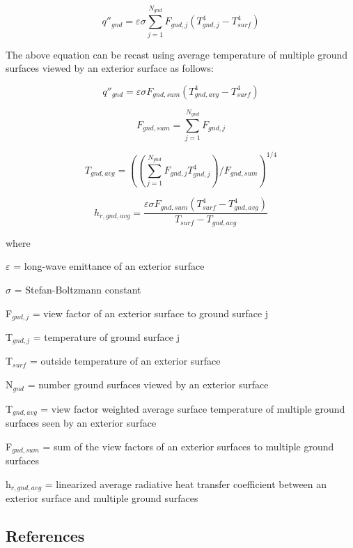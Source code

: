 \begin{equation}
{q''_{gnd}} = \varepsilon \sigma \sum\limits_{j = 1}^{{N_{gnd}}} {F_{gnd,j}} \left(T_{gnd,j}^4 - T_{surf}^4 \right)
\end{equation}

The above equation can be recast using average temperature of multiple ground surfaces viewed by an exterior surface as follows:

\begin{equation}
{q''_{gnd}} = \varepsilon \sigma {F_{gnd,sum}} (T_{gnd,avg}^4 - T_{surf}^4)
\end{equation}

\begin{equation}
{F_{gnd,sum}} = \sum\limits_{j = 1}^{{N_{gnd}}} {F_{gnd,j}}
\end{equation}

\begin{equation}
{T_{gnd,avg}} = ((\sum\limits_{j = 1}^{{N_{gnd}}} {F_{gnd,j}} {T_{gnd,j}^4}) / {F_{gnd,sum}})^{1/4}
\end{equation}

\begin{equation}
{h_{r,gnd,avg}} = \frac{{\varepsilon \sigma {F_{gnd, sum}}(T_{surf}^4 - T_{gnd,avg}^4)}}{{{T_{surf}} - {T_{gnd,avg}}}}
\end{equation}

where

$\varepsilon$ = long-wave emittance of an exterior surface

$\sigma$ = Stefan-Boltzmann constant

F\(_{gnd,j}\) = view factor of an exterior surface to ground surface j

T\(_{gnd,j}\) = temperature of ground surface j

T\(_{surf}\) = outside temperature of an exterior surface

N\(_{gnd}\) = number ground surfaces viewed by an exterior surface

T\(_{gnd,avg}\) = view factor weighted average surface temperature of multiple ground surfaces seen by an exterior surface

F\(_{gnd,sum}\) = sum of the view factors of an exterior surfaces to multiple ground surfaces 

h\(_{r,gnd,avg}\) = linearized average radiative heat transfer coefficient between an exterior surface and multiple ground surfaces


\subsection{References}\label{references-034}

